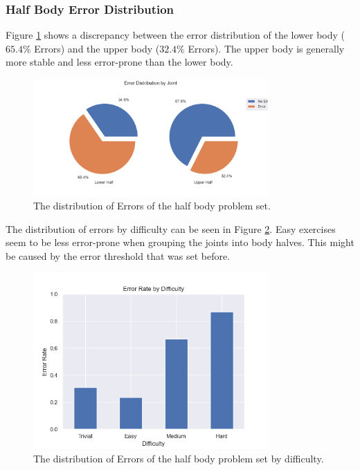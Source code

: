 \subsubsection{Half Body Error Distribution}

Figure \ref{fig:hb_pie} shows a discrepancy between the error distribution of the lower body ($65.4\%$ Errors) and the upper body ($32.4\%$ Errors). The upper body is generally more stable and less error-prone than the lower body.

\begin{figure}
  \centering
  \includegraphics[width=0.8\textwidth]{figures/Data/dist_half_body/Error_Distribution_by_Joint.png}
  \caption[Error Distribution by Body Half]{The distribution of Errors of the half body problem set.}
  \label{fig:hb_pie}
\end{figure}

The distribution of errors by difficulty can be seen in Figure \ref{fig:hb_diff_dist}. Easy exercises seem to be less error-prone when grouping the joints into body halves. This might be caused by the error threshold that was set before.

\begin{figure}
  \centering
  \includegraphics[width=0.8\textwidth]{figures/Data/dist_half_body/Error_Rate_by_Difficulty.png}
  \caption[Error Distribution of the Half Body by difficulty]{The distribution of Errors of the half body problem set by difficulty.}
  \label{fig:hb_diff_dist}
\end{figure}

